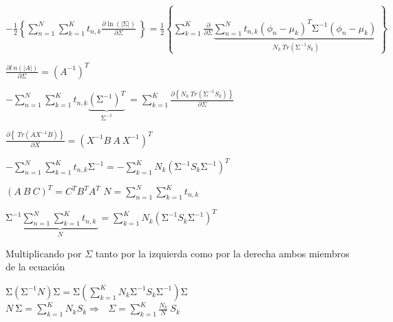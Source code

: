 \documentclass{article}
\begin{document}
$ \displaystyle
    -\frac{1}{2}\left\{\sum_{n=1}^{N}\sum_{k=1}^{K}{t_{n,k}\frac{\partial \ln {\left(\left|\mathrm{\Sigma}\right|\right)}}{\partial\Sigma}\ }\right\}=\frac{1}{2}
    \left\{
        \sum_{k=1}^{K}{
            \frac{\partial}{\partial\Sigma}{
                \underbrace{\sum_{n=1}^{N}{t_{n,k}\left(\phi_n-\mu_k\right)^T\mathrm{\Sigma}^{-1}\left(\phi_n-\mu_k\right)\ }}_{N_k\ Tr\left(\mathrm{\Sigma}^{-1}S_k\right)}}
        }
    \right\}
$

\begin{center}
    $\displaystyle \frac{\partial l\ n{\left(\left|A\right|\right)}}{\partial\Sigma}=\left(A^{-1}\right)^T $
\end{center}

$ \displaystyle
    -\sum_{n=1}^{N}{
        \sum_{k=1}^{K}{
            t_{n,k}{\underbrace{\left(\mathrm{\Sigma}^{-1}\right)^T}_{\mathrm{\Sigma}^{-1}}}\ 
        }
    }=\sum_{k=1}^{K}{
        \frac{\partial\left\{N_k\ Tr\left(\mathrm{\Sigma}^{-1}S_k\right)\right\}}{\partial\Sigma}
    }
$

\begin{center}
    $\displaystyle \frac{\partial\left\{\ Tr\left(AX^{-1}B\right)\right\}}{\partial X}=\left(X^{-1}B\ A\ X^{-1}\right)^T $
\end{center}

$\displaystyle
    -\sum_{n=1}^{N}\sum_{k=1}^{K}{t_{n,k}\mathrm{\Sigma}^{-1}}=-\sum_{k=1}^{K}N_k\left(\mathrm{\Sigma}^{-1}S_k\mathrm{\Sigma}^{-1}\right)^T
$

\begin{center}
    $\displaystyle \left(A\ B\ C\right)^T=C^TB^TA^T $
    $\displaystyle N=\sum_{n=1}^{N}\sum_{k=1}^{K}{t_{n,k}\ } $
\end{center}

$\displaystyle
    \mathrm{\Sigma}^{-1}\underbrace{
    \sum_{n=1}^{N}{
        \sum_{k=1}^{K}{
            t_{n,k}\ 
        }
    }
    }_N
     =\sum_{k=1}^{K}{
        N_k\left(\mathrm{\Sigma}^{-1}S_k\mathrm{\Sigma}^{-1}\right)^T
     }
$

\begin{center}
    Multiplicando por $\Sigma$ tanto por la izquierda como por la derecha ambos miembros de la ecuaci\'on
\end{center}

$\displaystyle
    \mathrm{\Sigma}\left(\mathrm{\Sigma}^{-1}N\right)\mathrm{\Sigma}=\mathrm{\Sigma}\left(\sum_{k=1}^{K}N_k\mathrm{\Sigma}^{-1}S_k\mathrm{\Sigma}^{-1}\right)\mathrm{\Sigma}
$
$\displaystyle
    N\ \mathrm{\Sigma}=\sum_{k=1}^{K}{N_kS_k}\Longrightarrow\ \ \ \Sigma=\sum_{k=1}^{K}{\frac{N_k}{N}\ S_k}
$
\end{document}
